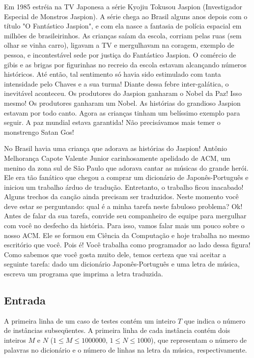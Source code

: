 Em 1985 estréia na TV Japonesa a série Kyojiu Tokusou Jaspion (Investigador
Especial de Monstros Jaspion). A série chega ao Brasil alguns anos
depois com o título "O Fantástico Jaspion", e com ela nasce a fantasia de
polícia espacial em milhões de brasileirinhos. As crianças saíam da escola,
corriam pelas ruas (sem olhar se vinha carro), ligavam a TV e mergulhavam na
coragem, exemplo de pessoa, e incontestável sede por justiça do Fantástico
Jaspion. O comércio de gibis e as brigas por figurinhas no recreio da escola
estavam alcançando números históricos. Até então, tal sentimento só havia
sido estimulado com tanta intensidade pelo Chaves e a sua turma! Diante
dessa febre inter-galática, o inevitável aconteceu. Os produtores do Jaspion
ganharam o Nobel da Paz! Isso mesmo! Os produtores ganharam um Nobel. As
histórias do grandioso Jaspion estavam por todo canto. Agora as crianças
tinham um belíssimo exemplo para seguir. A paz mundial estava garantida! Não
precisávamos mais temer o monstrengo Satan Gos!

No Brasil havia uma criança que adorava as histórias do Jaspion! Antônio
Melhorança Capote Valente Junior carinhosamente apelidado de ACM, um menino da
zona sul de São Paulo que adorava cantar as músicas do grande herói. Ele era tão
fanático que chegou a comprar um dicionário de Japonês-Português e iniciou um
trabalho árduo de tradução. Entretanto, o trabalho ficou inacabado! Alguns
trechos da canção ainda precisam ser traduzidos. Neste momento você deve estar
se perguntando: qual é a minha tarefa neste fabuloso problema? Ok! Antes de
falar da sua tarefa, convide seu companheiro de equipe para mergulhar com você
no desfecho da história. Para isso, vamos falar mais um pouco sobre o nosso ACM.
Ele se formou em Ciência da Computação e hoje trabalha no mesmo escritório que
você. Pois é! Você trabalha como programador ao lado dessa figura! Como sabemos
que você gosta muito dele, temos certeza que vai aceitar a seguinte tarefa: dado
um dicionário Japonês-Português e uma letra de música, escreva um programa que
imprima a letra traduzida.


\subsection*{Entrada}

A primeira linha de um caso de testes contém um inteiro $T$ que indica o número de
instâncias subseqüentes. A primeira linha de cada instância contém dois inteiros
$M$ e $N$ ($1 \leq M \leq 1000000$, $1 \leq N \leq 1000$), que representam o número de palavras no
dicionário e o número de linhas na letra da música, respectivamente.

